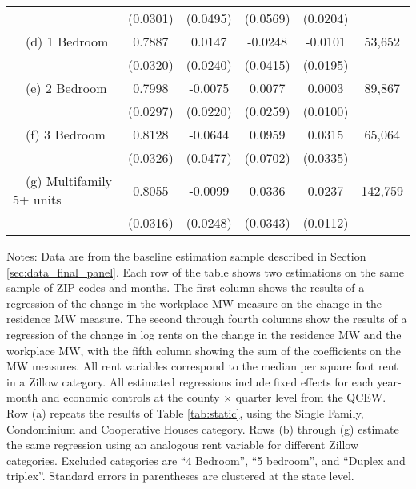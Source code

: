 \begin{landscape}
\begin{table}[ht!]
\begin{tabular}{@{}lccccc@{}}
                                                 & (0.0301) & (0.0495) & (0.0569) & (0.0204) &      \\
        $\quad$(d) 1 Bedroom                     &  0.7887  &  0.0147  &  -0.0248  &  -0.0101  & 53,652 \\
                                                 & (0.0320) & (0.0240) & (0.0415) & (0.0195) &      \\
        $\quad$(e) 2 Bedroom                     &  0.7998  &  -0.0075  &  0.0077  &  0.0003  & 89,867 \\
                                                 & (0.0297) & (0.0220) & (0.0259) & (0.0100) &      \\
        $\quad$(f) 3 Bedroom                     &  0.8128  &  -0.0644  &  0.0959  &  0.0315  & 65,064 \\
                                                 & (0.0326) & (0.0477) & (0.0702) & (0.0335) &      \\
        $\quad$(g) Multifamily 5+ units          &  0.8055  &  -0.0099  &  0.0336  &  0.0237  & 142,759 \\
                                                 & (0.0316) & (0.0248) & (0.0343) & (0.0112) &      \\ \bottomrule
    \end{tabular}

    \begin{minipage}{.95\linewidth} \footnotesize
        \vspace{2mm}
        Notes:
        Data are from the baseline estimation sample described in Section 
        \ref{sec:data_final_panel}.
        Each row of the table shows two estimations on the same sample of ZIP 
        codes and months.
        The first column shows the results of a regression of the change in the 
        workplace MW measure on the change in the residence MW measure.
        The second through fourth columns show the results of a regression of 
        the change in log rents on the change in the residence MW and the 
        workplace MW, with the fifth column showing the sum of the coefficients 
        on the MW measures.
        All rent variables correspond to the median per square foot rent in a 
        Zillow category.
        All estimated regressions include fixed effects for each year-month and 
        economic controls at the county $\times$ quarter level from the QCEW.
        Row (a) repeats the results of Table \ref{tab:static}, using the 
        Single Family, Condominium and Cooperative Houses category.
        Rows (b) through (g) estimate the same regression using an analogous 
        rent variable for different Zillow categories.
        Excluded categories are ``4 Bedroom'', ``5 bedroom'', and 
        ``Duplex and triplex''.
        Standard errors in parentheses are clustered at the state level.
    \end{minipage}
\end{table}
\end{landscape}
